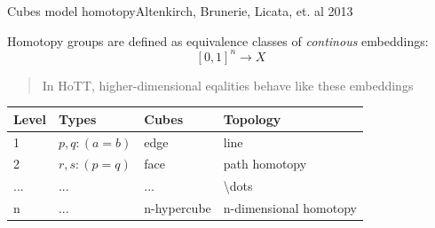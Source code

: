 \documentclass[english,draft]{beamer}
\begin{document}
\begin{frame}{Cubes model homotopy}{Altenkirch, Brunerie, Licata, et. al 2013}
 
Homotopy groups are defined as equivalence classes of \emph{continous} embeddings:
$$[0,1]^n \rightarrow X$$

\begin{quotation}
In HoTT, higher-dimensional eqalities behave like these embeddings
\end{quotation}
\pause

    \begin{table}[]
        \begin{tabular}{@{}llll@{}}
        \toprule
        Level                & Types                & Cubes                 & Topology               \\ \midrule
        1                    & $p,q : (a = b)$        & edge                  & line                   \\
        2                    & $r,s : (p = q)$        & face                  & path homotopy          \\
        ... & ... & ... & \textbackslash{}dots   \\
        n                    & ... & n-hypercube           & n-dimensional homotopy \\ \bottomrule
        \end{tabular}
    \end{table}

%  
\end{frame}
\end{document}
